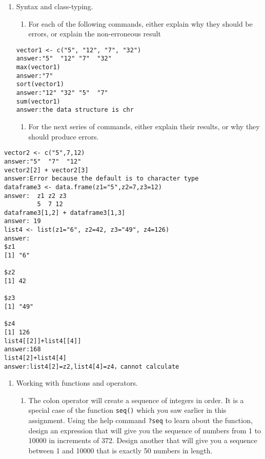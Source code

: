 \documentclass[
]{article}
\providecommand{\tightlist}{%
  \setlength{\itemsep}{0pt}\setlength{\parskip}{0pt}}
\begin{document}
\begin{enumerate}
\def\labelenumi{\arabic{enumi}.}
\setcounter{enumi}{1}
\item
  Syntax and class-typing.

  \begin{enumerate}
  \def\labelenumii{\alph{enumii}.}
  \tightlist
  \item
    For each of the following commands, either explain why they should
    be errors, or explain the non-erroneous result
  \end{enumerate}

\begin{verbatim}
vector1 <- c("5", "12", "7", "32") 
answer:"5"  "12" "7"  "32"
max(vector1)  
answer:"7"
sort(vector1) 
answer:"12" "32" "5"  "7" 
sum(vector1) 
answer:the data structure is chr
\end{verbatim}

  \begin{enumerate}
  \def\labelenumii{\alph{enumii}.}
  \setcounter{enumii}{1}
  \tightlist
  \item
    For the next series of commands, either explain their results, or
    why they should produce errors.
  \end{enumerate}
\end{enumerate}

\begin{verbatim}
vector2 <- c("5",7,12) 
answer:"5"  "7"  "12"
vector2[2] + vector2[3] 
answer:Error because the default is to character type
dataframe3 <- data.frame(z1="5",z2=7,z3=12) 
answer:  z1 z2 z3
         5  7 12
dataframe3[1,2] + dataframe3[1,3]
answer: 19
list4 <- list(z1="6", z2=42, z3="49", z4=126)
answer:
$z1
[1] "6"

$z2
[1] 42

$z3
[1] "49"

$z4
[1] 126
list4[[2]]+list4[[4]]
answer:168
list4[2]+list4[4]
answer:list4[2]=z2,list4[4]=z4，cannot calculate
\end{verbatim}

\begin{enumerate}
\def\labelenumi{\arabic{enumi}.}
\setcounter{enumi}{2}
\tightlist
\item
  Working with functions and operators.

  \begin{enumerate}
  \def\labelenumii{\alph{enumii}.}
  \tightlist
  \item
    The colon operator will create a sequence of integers in order. It
    is a special case of the function \texttt{seq()} which you saw
    earlier in this assignment. Using the help command \texttt{?seq} to
    learn about the function, design an expression that will give you
    the sequence of numbers from 1 to 10000 in increments of 372. Design
    another that will give you a sequence between 1 and 10000 that is
    exactly 50 numbers in length.
  \end{enumerate}
\end{enumerate}
\end{document}
